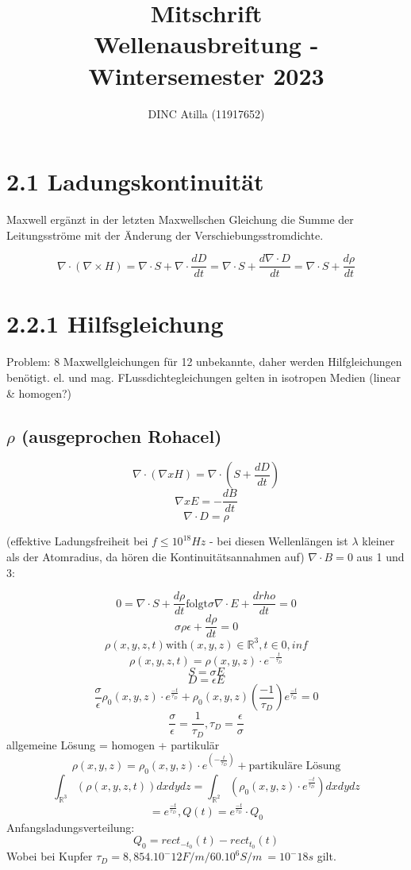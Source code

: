 \documentclass[a4paper]{article}
\title{Mitschrift\\Wellenausbreitung - Wintersemester 2023}
\author{DINC Atilla (11917652)}
\begin{document}
\normalsize
\maketitle

\section*{2.1 Ladungskontinuität}
Maxwell ergänzt in der letzten Maxwellschen Gleichung die Summe der Leitungsströme mit der Änderung der Verschiebungsstromdichte.

\[
\nabla \cdot (\nabla \times H) = \nabla \cdot S + \nabla\cdot\frac{dD}{dt}
= \nabla\cdot S + \frac{d\nabla\cdot D}{dt}
= \nabla\cdot S + \frac{d\rho}{dt}
\]

\section*{2.2.1 Hilfsgleichung}
Problem: 8 Maxwellgleichungen für 12 unbekannte, daher werden Hilfgleichungen benötigt.\newline
el. und mag. FLussdichtegleichungen gelten in isotropen Medien (linear \& homogen?)


\subsection*{$\rho$ (ausgeprochen Rohacel)}
\[\nabla\cdot(\nabla x H)=\nabla\cdot (S+\frac{dD}{dt})\]
\[\nabla xE = -\frac{dB}{dt}\]
\[\nabla \cdot D=\rho\]

(effektive Ladungsfreiheit bei $f\le 10^18 Hz$ - bei diesen Wellenlängen ist $\lambda$ kleiner als der Atomradius, da hören die Kontinuitätsannahmen auf)\newline
$\nabla\cdot B=0$\newline
aus 1 und 3:

\[0 = \nabla\cdot S+\frac{d\rho}{dt} \text{folgt} \sigma \nabla\cdot E+\frac{drho}{dt}=0\]
\[\sigma \rho\epsilon+\frac{d\rho}{dt}=0\]
\[\rho (x,y,z,t) \text{with} (x,y,z) \in \mathbb{R}^{3}, t\in 0, inf \]
\[\rho(x,y,z,t)=\rho(x,y,z)\cdot e^{-\frac{t}{\tau_{D}}}\]
\[S = \sigma E\]
\[D=\epsilon E\]
\[\frac{\sigma}{\epsilon} \rho_{0}(x,y,z)\cdot e^{\frac{-t}{\tau_{D}}} + \rho_{0}(x,y,z)(\frac{-1}{\tau_{D}})e^{\frac{-t}{\tau_{D}}}=0\]
\[\frac{\sigma}{\epsilon}= \frac{1}{\tau_{D}}, \tau_{D}=\frac{\epsilon}{\sigma}\]
allgemeine Lösung = homogen + partikulär
\[\rho(x,y,z) = \rho_{0}(x,y,z)\cdot e^(-\frac{t}{\tau_{D}}) + \text{partikuläre Lösung}\]
\[\int_{\mathbb{R}^3}(\rho(x,y,z,t))dxdydz = \int_{\mathbb{R}^2}(\rho_{0}(x,y,z)\cdot e^\frac{-t}{\tau_{D}})dxdydz\]
\[= e^\frac{-t}{\tau_{D}}, Q(t)=e^\frac{-t}{\tau_{D}}\cdot Q_{0}\]
Anfangsladungsverteilung:
\[Q_{0}=rect_{-t_{0}}(t) - rect_{t_{0}}(t)\]
Wobei bei Kupfer $\tau_{D} = 8,854.10^-12 F/m / 60.10^6S/m~=10^-18s$ gilt. 
\end{document}
